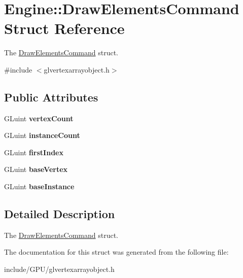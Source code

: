\hypertarget{structEngine_1_1DrawElementsCommand}{}\section{Engine\+:\+:Draw\+Elements\+Command Struct Reference}
\label{structEngine_1_1DrawElementsCommand}


The \hyperlink{structEngine_1_1DrawElementsCommand}{Draw\+Elements\+Command} struct.  




{\ttfamily \#include $<$glvertexarrayobject.\+h$>$}

\subsection*{Public Attributes}
\begin{DoxyCompactItemize}
\item 
\hypertarget{structEngine_1_1DrawElementsCommand_a172930ac87063057bbd32e41ff191f03}{}G\+Luint {\bfseries vertex\+Count}\label{structEngine_1_1DrawElementsCommand_a172930ac87063057bbd32e41ff191f03}

\item 
\hypertarget{structEngine_1_1DrawElementsCommand_aecb2f3a602a00559404bc7cdce7d14da}{}G\+Luint {\bfseries instance\+Count}\label{structEngine_1_1DrawElementsCommand_aecb2f3a602a00559404bc7cdce7d14da}

\item 
\hypertarget{structEngine_1_1DrawElementsCommand_a75c7d73db84332530e4b0097e62f939f}{}G\+Luint {\bfseries first\+Index}\label{structEngine_1_1DrawElementsCommand_a75c7d73db84332530e4b0097e62f939f}

\item 
\hypertarget{structEngine_1_1DrawElementsCommand_ad07e7d6f304e0a71e41e2bd375888f6b}{}G\+Luint {\bfseries base\+Vertex}\label{structEngine_1_1DrawElementsCommand_ad07e7d6f304e0a71e41e2bd375888f6b}

\item 
\hypertarget{structEngine_1_1DrawElementsCommand_a500c4f20f38654ff58eafb3c34197999}{}G\+Luint {\bfseries base\+Instance}\label{structEngine_1_1DrawElementsCommand_a500c4f20f38654ff58eafb3c34197999}

\end{DoxyCompactItemize}


\subsection{Detailed Description}
The \hyperlink{structEngine_1_1DrawElementsCommand}{Draw\+Elements\+Command} struct. 

The documentation for this struct was generated from the following file\+:\begin{DoxyCompactItemize}
\item 
include/\+G\+P\+U/glvertexarrayobject.\+h\end{DoxyCompactItemize}
